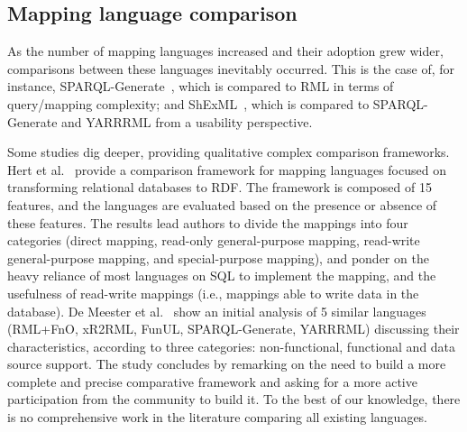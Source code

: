 \subsection{Mapping language comparison}
As the number of mapping languages increased and their adoption grew wider, comparisons between these languages inevitably occurred. This is the case of, for instance, SPARQL-Generate~\citep{Lefrancois2017sparqlgenerate}, which is compared to RML in terms of query/mapping complexity; and ShExML~\citep{Garcia-Gonzalez2020shexml}, which is compared to SPARQL-Generate and YARRRML from a usability perspective.

Some studies dig deeper, providing qualitative complex comparison frameworks. Hert et al.~\citep{hert2011comparison} provide a comparison framework for mapping languages focused on transforming relational databases to RDF. The framework is composed of 15 features, and the languages are evaluated based on the presence or absence of these features.%
The results lead authors to divide the mappings into four categories (direct mapping, read-only general-purpose mapping, read-write general-purpose mapping, and special-purpose mapping), and ponder on the heavy reliance of most languages on SQL to implement the mapping, and the usefulness of read-write mappings (i.e., mappings able to write data in the database). De Meester et al.~\citep{DeMeester2019comparison} show an initial analysis of 5 similar languages (RML+FnO, xR2RML, FunUL, SPARQL-Generate, YARRRML) discussing their characteristics, according to three categories: non-functional, functional and data source support. The study concludes by remarking on the need to build a more complete and precise comparative framework and asking for a more active participation from the community to build it. To the best of our knowledge, there is no comprehensive work in the literature comparing all existing languages.  
